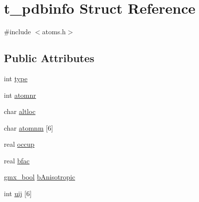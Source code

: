 \hypertarget{structt__pdbinfo}{\section{t\-\_\-pdbinfo \-Struct \-Reference}
\label{structt__pdbinfo}
}


{\ttfamily \#include $<$atoms.\-h$>$}

\subsection*{\-Public \-Attributes}
\begin{DoxyCompactItemize}
\item 
int \hyperlink{structt__pdbinfo_a21b6c83fcd63508a0c69863cce44c971}{type}
\item 
int \hyperlink{structt__pdbinfo_abba7526af908e6c39889b1a06dc47cc6}{atomnr}
\item 
char \hyperlink{structt__pdbinfo_a105f60fd503343184fc58f311e5d45f6}{altloc}
\item 
char \hyperlink{structt__pdbinfo_a9896fa90ca0eb6d8ad2b218cbc800ee3}{atomnm} \mbox{[}6\mbox{]}
\item 
real \hyperlink{structt__pdbinfo_a3da8bcfa53a25a6845f422837eb66e1a}{occup}
\item 
real \hyperlink{structt__pdbinfo_a832bd8714d210370247bc434109269b9}{bfac}
\item 
\hyperlink{include_2types_2simple_8h_a8fddad319f226e856400d190198d5151}{gmx\-\_\-bool} \hyperlink{structt__pdbinfo_a783a654e896ef07270f07495f1498fea}{b\-Anisotropic}
\item 
int \hyperlink{structt__pdbinfo_ae44927d120b35fe2707bc84f12bbee4d}{uij} \mbox{[}6\mbox{]}
\end{DoxyCompactItemize}


